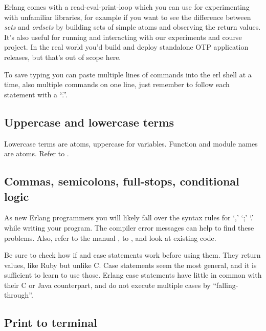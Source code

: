 \documentclass[a4paper]{article}
\begin{document}
Erlang comes with a read-eval-print-loop which you can use for experimenting
with unfamiliar libraries, for example if you want to see the difference
between \emph{sets} and \emph{ordsets} by building sets of simple atoms and
observing the return values. It's also useful for running and interacting with
our experiments and course project. In the real world you'd build and deploy
standalone OTP application releases, but that's out of scope here.

To save typing you can paste multiple lines of commands into the erl shell at
a time, also multiple commands on one line, just remember to follow each
statement with a ``.''.




\subsection{Uppercase and lowercase terms} %
\label{sub:uppercase_and_lowercase_terms}

Lowercase terms are atoms, uppercase for variables. Function and module names
are atoms. Refer to \cite{manual_expressions}.


\subsection{Commas, semicolons, full-stops, conditional logic} %
\label{sub:commas_semicolons_full_stops}

As new Erlang programmers you will likely fall over the syntax rules for `,'
`;' `.' while writing your program. The compiler error messages can help to
find these problems. Also, refer to the manual \cite{manual_functions}, to
\cite{lyse_function_syntax}, and look at existing code.

Be sure to check how if and case statements work before using them. They
return values, like Ruby but unlike C. Case statements seem the most general,
and it is sufficient to learn to use those. Erlang case statements have little
in common with their C or Java counterpart, and do not execute multiple
cases by ``falling-through''.


\subsection{Print to terminal} %
\label{sub:debug_printing}
\end{document}
